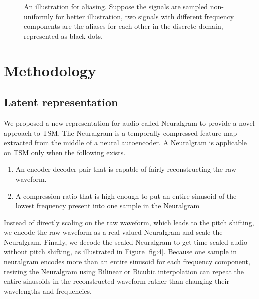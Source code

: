 \documentclass[12pt]{article}
\begin{document}
\begin{figure}
\begin{center}


\end{center}
\caption{An illustration for aliasing. Suppose the signals are sampled non-uniformly for better illustration, two signals with different frequency components are the aliases for each other in the discrete domain, represented as black dots.}
\label{fig:3}
\end{figure}

\section{Methodology}

\subsection{Latent representation}
We proposed a new representation for audio called Neuralgram to provide a novel approach to TSM. The Neuralgram is a temporally compressed feature map extracted from the middle of a neural autoencoder. A Neuralgram is applicable on TSM only when the following exists.
\begin{enumerate}
  \item{An encoder-decoder pair that is capable of fairly reconstructing the raw waveform.}
  \item{A compression ratio that is high enough to put an entire sinusoid of the lowest frequency present into one sample in the Neuralgram}
\end{enumerate}

Instead of directly scaling on the raw waveform, which leads to the pitch shifting, we encode the raw waveform as a real-valued Neuralgram and scale the Neuralgram. Finally, we decode the scaled Neuralgram to get time-scaled audio without pitch shifting, as illustrated in Figure \ref{fig:4}. Because one sample in neuralgram encodes more than an entire sinusoid for each frequency component, resizing the Neuralgram using Bilinear \cite{smi81} or Bicubic \cite{key81} interpolation can repeat the entire sinusoids in the reconstructed waveform rather than changing their wavelengths and frequencies.
\end{document}
